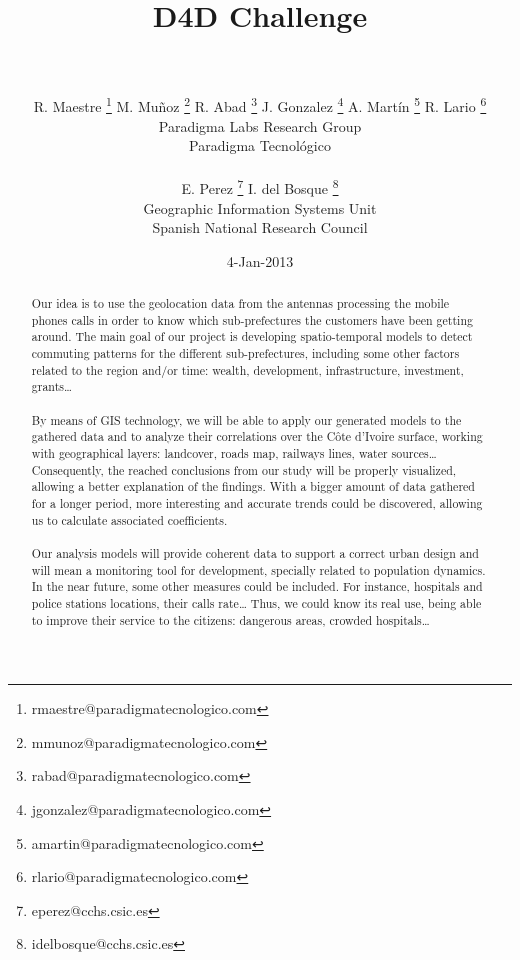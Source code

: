 \documentclass[a4paper,11pt]{article}
\begin{document}
\title{{\huge D4D Challenge} \\  \\ }

\author{{
				R. Maestre  \footnote{rmaestre@paradigmatecnologico.com} 
				M. Muñoz  \footnote{mmunoz@paradigmatecnologico.com} 
				R. Abad  \footnote{rabad@paradigmatecnologico.com} 
				J. Gonzalez  \footnote{jgonzalez@paradigmatecnologico.com} 
				A. Martín  \footnote{amartin@paradigmatecnologico.com} 
				R. Lario  \footnote{rlario@paradigmatecnologico.com} 
				\\\small Paradigma Labs Research Group \\\small Paradigma Tecnológico\\ \\
				E. Perez  \footnote{eperez@cchs.csic.es} 
				I. del Bosque  \footnote{idelbosque@cchs.csic.es} 
				\\\small Geographic Information Systems Unit \\\small Spanish National Research Council
				}}

\date{4-Jan-2013}
\maketitle

\begin{abstract} 
Our idea is to use the geolocation data from the antennas processing the mobile phones calls in order to know which sub-prefectures the customers have been getting around. The main goal of our project is developing spatio-temporal models to detect commuting patterns for the different sub-prefectures, including some other factors related to the region and/or time: wealth, development, infrastructure, investment, grants…
\\
\\
By means of GIS technology, we will be able to apply our generated models to the gathered data and to analyze their correlations over the Côte d’Ivoire surface, working with geographical layers: landcover, roads map, railways lines, water sources… Consequently, the reached conclusions from our study will be properly visualized, allowing a better explanation of the findings. With a bigger amount of data gathered for a longer period, more interesting and accurate trends could be discovered, allowing us to calculate associated coefficients.
\\
\\
Our analysis models will provide coherent data to support a correct urban design and will mean a monitoring tool for development, specially related to population dynamics.
In the near future, some other measures could be included. For instance, hospitals and police stations locations, their calls rate… Thus, we could know its real use, being able to improve their service to the citizens: dangerous areas, crowded hospitals…
\end{abstract}
\end{document}
